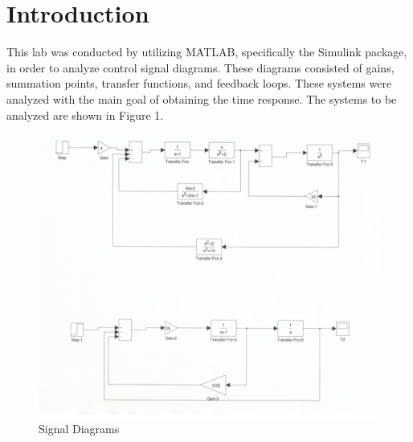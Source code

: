 \documentclass[12pt]{article}
\begin{document}

\newpage


\section*{\fontsize{12}{12}\selectfont \large Introduction}
This lab was conducted by utilizing MATLAB, specifically the Simulink package, in order to analyze control signal diagrams. These diagrams consisted of gains, summation points, transfer functions, and feedback loops. These systems were analyzed with the main goal of obtaining the time response. The systems to be analyzed are shown in Figure 1. 
\bigskip
\bigskip

\begin{figure}[htbp] %
   \centering
   \includegraphics[width=\linewidth]{signal_diagrams.jpg} 
   \caption{Signal Diagrams}
   \label{fig:example}
\end{figure}

\newpage


\end{document}
